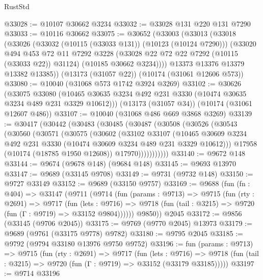 \begin{lexlean}{RustStd}
\begin{coremodule}
@33028 := @10107 @30662 @3234
@33032 := @33028 @131 @220 @131 @7290
@33033 := @10116 @30662
@33075 := @30652
    (@33003
      (@33013
        (@33018
          (@33026
            (@33032 (@10115 (@33033 @131)) (@10123 (@10124 @7290)))
            (@33020
              @494
              @453
              @72
              @11
              @7292
              @3228
              (@33028 @22 @72 @22 @7292 (@10115 (@33033 @22)) @31124)
              (@10185 @30662 @3234))))
        @13373
        @13376
        @13379
        @13382
        @13385))
    (@13173 (@31057 @22))
    (@10174 (@31061 @12606 @573))
@33080 := @10040 (@31068 @573 @1742 @3924 @3269)
@33102 := @30626
    (@33075
      @33080
      (@10465 @30635 @3234 @492 @231 @3330 (@10474 @30635 @3234 @489 @231 @3329 @10612)))
    (@13173 (@31057 @34))
    (@10174 (@31061 @12607 @486))
@33107 := @10040 (@31068 @486 @669 @3868 @3269)
@33139 := @30417
    (@30442
      (@30483
        (@30485
          (@30487
            (@30508
              (@30526
                (@30543
                  (@30560
                    (@30571
                      (@30575
                        (@30602
                          (@33102
                            @33107
                            (@10465
                              @30609
                              @3234
                              @492
                              @231
                              @3330
                              (@10474 @30609 @3234 @489 @231 @3329 @10612)))
                          @17958
                          (@10174 (@18785 @1950 @12608))
                          @17970)))))))))))
@33140 := @9672 @148
@33144 := @9674 (@9678 @148) (@9684 @148)
@33145 := @9693 @13970
@33147 := @9689 (@33145 @9708)
@33149 := @9731 (@9732 @148)
@33150 := @9727 @33149
@33152 := @9689 (@33150 @9757)
@33169 := @9688
    (fun (fn : @404) =>
    @33147
      (@9711
        (@9714
          (fun (params : @9713) =>
          @9715
            (fun (rty : @2691) =>
            @9717
              (fun (lets : @9716) =>
              @9718 (fun (tail : @3215) => @9720 (fun (Γ : @9719) => @33152 @9804))))))
        @9850))
    @2045
@33172 := @9856 (@33145 (@9706 @2045))
@33175 := @9769 (@9770 @2045) @13973
@33179 := @9689 (@9761 (@33175 @9778) @9782)
@33180 := @9795 @2045
@33185 := @9792 (@9794 @33180 @13976 @9750 @9752)
@33196 := fun (params : @9713) =>
  @9715
    (fun (rty : @2691) =>
    @9717
      (fun (lets : @9716) =>
      @9718 (fun (tail : @3215) => @9720 (fun (Γ : @9719) => @33152 (@33179 @33185)))))
@33197 := @9714 @33196

\end{coremodule}
\end{lexlean}
